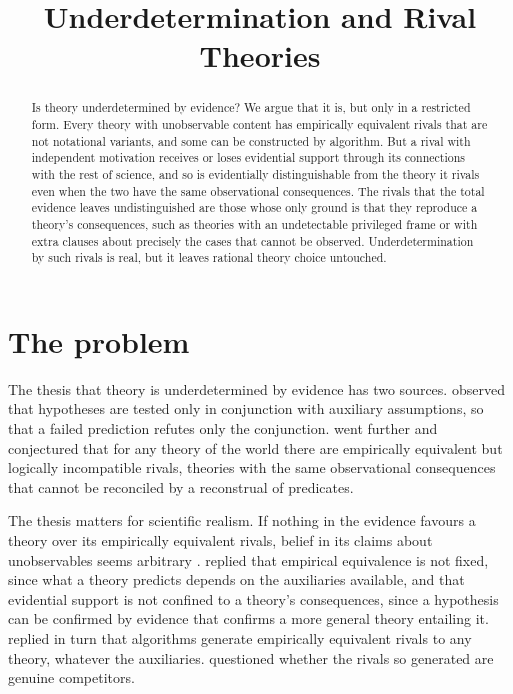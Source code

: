 \documentclass{situationist-preprint}
\title{Underdetermination and Rival Theories}
\begin{document}
\maketitle

\begin{abstract}
Is theory underdetermined by evidence? We argue that it is, but only in a restricted form. Every theory with unobservable content has empirically equivalent rivals that are not notational variants, and some can be constructed by algorithm. But a rival with independent motivation receives or loses evidential support through its connections with the rest of science, and so is evidentially distinguishable from the theory it rivals even when the two have the same observational consequences. The rivals that the total evidence leaves undistinguished are those whose only ground is that they reproduce a theory's consequences, such as theories with an undetectable privileged frame or with extra clauses about precisely the cases that cannot be observed. Underdetermination by such rivals is real, but it leaves rational theory choice untouched.
\end{abstract}

\section{The problem}

The thesis that theory is underdetermined by evidence has two sources. \citet{Duhem1954} observed that hypotheses are tested only in conjunction with auxiliary assumptions, so that a failed prediction refutes only the conjunction. \citet{Quine1975} went further and conjectured that for any theory of the world there are empirically equivalent but logically incompatible rivals, theories with the same observational consequences that cannot be reconciled by a reconstrual of predicates.

The thesis matters for scientific realism. If nothing in the evidence favours a theory over its empirically equivalent rivals, belief in its claims about unobservables seems arbitrary \citep{vanFraassen1980}. \citet{LaudanLeplin1991} replied that empirical equivalence is not fixed, since what a theory predicts depends on the auxiliaries available, and that evidential support is not confined to a theory's consequences, since a hypothesis can be confirmed by evidence that confirms a more general theory entailing it. \citet{Kukla1993} replied in turn that algorithms generate empirically equivalent rivals to any theory, whatever the auxiliaries. \citet{Earman1993} questioned whether the rivals so generated are genuine competitors.
\end{document}
